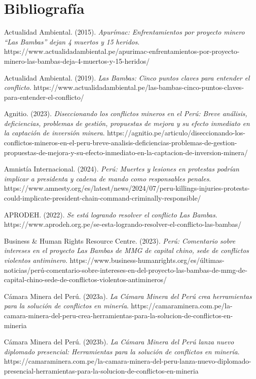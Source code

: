 \documentclass[
  stu,
  floatsintext,
  longtable,
  a4paper,
  nolmodern,
  notxfonts,
  notimes,
  colorlinks=true,linkcolor=blue,citecolor=blue,urlcolor=blue]{apa7}
\begin{document}
\section{Bibliografía}\label{bibliografuxeda}

Actualidad Ambiental. (2015). \emph{Apurímac: Enfrentamientos por
proyecto minero ``Las Bambas'' dejan 4 muertos y 15 heridos}.
https://www.actualidadambiental.pe/apurimac-enfrentamientos-por-proyecto-minero-las-bambas-deja-4-muertos-y-15-heridos/

Actualidad Ambiental. (2019). \emph{Las Bambas: Cinco puntos claves para
entender el conflicto}.
https://www.actualidadambiental.pe/las-bambas-cinco-puntos-claves-para-entender-el-conflicto/

Agnitio. (2023). \emph{Diseccionando los conflictos mineros en el Perú:
Breve análisis, deficiencias, problemas de gestión, propuestas de mejora
y su efecto inmediato en la captación de inversión minera}.
https://agnitio.pe/articulo/diseccionando-los-conflictos-mineros-en-el-peru-breve-analisis-deficiencias-problemas-de-gestion-propuestas-de-mejora-y-su-efecto-inmediato-en-la-captacion-de-inversion-minera/

Amnistía Internacional. (2024). \emph{Perú: Muertes y lesiones en
protestas podrían implicar a presidenta y cadena de mando como
responsables penales}.
https://www.amnesty.org/es/latest/news/2024/07/peru-killings-injuries-protests-could-implicate-president-chain-command-criminally-responsible/

APRODEH. (2022). \emph{Se está logrando resolver el conflicto Las
Bambas}.
https://www.aprodeh.org.pe/se-esta-logrando-resolver-el-conflicto-las-bambas/

Business \& Human Rights Resource Centre. (2023). \emph{Perú: Comentario
sobre intereses en el proyecto Las Bambas de MMG de capital chino, sede
de conflictos violentos antiminero}.
https://www.business-humanrights.org/es/últimas-noticias/perú-comentario-sobre-intereses-en-del-proyecto-las-bambas-de-mmg-de-capital-chino-sede-de-conflictos-violentos-antimineros/

Cámara Minera del Perú. (2023a). \emph{La Cámara Minera del Perú crea
herramientas para la solución de conflictos en minería}.
https://camaraminera.com.pe/la-camara-minera-del-peru-crea-herramientas-para-la-solucion-de-conflictos-en-mineria

Cámara Minera del Perú. (2023b). \emph{La Cámara Minera del Perú lanza
nuevo diplomado presencial: Herramientas para la solución de conflictos
en minería}.
https://camaraminera.com.pe/la-camara-minera-del-peru-lanza-nuevo-diplomado-presencial-herramientas-para-la-solucion-de-conflictos-en-mineria
\end{document}
